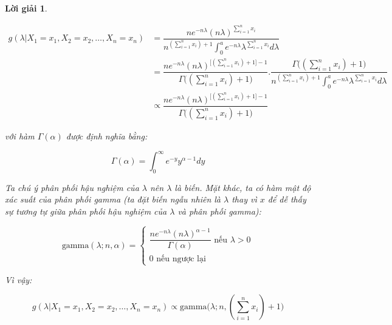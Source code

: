 \documentclass[14pt, a4paper]{article}
\theoremstyle{sltheorem}
\theoremstyle{soltheorem}
\newtheorem*{loigiai}{Lời giải}
\begin{document}
\begin{loigiai}
\begin{enumerate}
\begin{enumerate}[label=(\alph*)]
            \begin{equation*}
                \begin{aligned}
                    g(\lambda \vert X_1 =x_1, X_2=x_2, \dots, X_n=x_n) &= \dfrac{n e^{-n\lambda}(n\lambda)^{\sum_{i=1}^n x_i}}{n^{(\sum_{i=1}^n x_i) + 1}\displaystyle\int_{0}^a e^{-n\lambda} \lambda^{\sum_{i=1}^n x_i}d\lambda} \\
                    &= \dfrac{n e^{-n\lambda}(n\lambda)^{\big\lbrack(\sum_{i=1}^n x_i) + 1\big\rbrack - 1}}{\Gamma\big((\sum_{i=1}^n x_i) + 1\big)}.\dfrac{\Gamma\big((\sum_{i=1}^n x_i) + 1\big)}{n^{(\sum_{i=1}^n x_i) + 1}\displaystyle\int_{0}^a e^{-n\lambda} \lambda^{\sum_{i=1}^n x_i}d\lambda} \\
                    &\propto \dfrac{n e^{-n\lambda}(n\lambda)^{\big\lbrack(\sum_{i=1}^n x_i) + 1\big\rbrack - 1}}{\Gamma\big((\sum_{i=1}^n x_i) + 1\big)}
                \end{aligned}
            \end{equation*}

            với hàm $\Gamma(\alpha)$ được định nghĩa bằng:

            \begin{equation*}
                \Gamma(\alpha) = \int_{0}^{\infty} e^{-y} y^{\alpha - 1} dy
            \end{equation*}

            Ta chú ý phân phối hậu nghiệm của $\lambda$ nên $\lambda$ là biến.
            Mặt khác, ta có hàm mật độ xác suất của phân phối gamma (ta đặt biến ngẫu nhiên là $\lambda$ thay vì $x$ để dễ thấy sự tương tự giữa phân phối hậu nghiệm của $\lambda$ và phân phối gamma):

            \begin{equation*}
                \text{gamma}(\lambda; n, \alpha) = \begin{cases}
                    \dfrac{n e^{-n\lambda} (n\lambda)^{\alpha - 1}}{\Gamma(\alpha)} \text{ nếu } \lambda > 0 \\
                    0 \text{ nếu ngược lại}
                \end{cases}
            \end{equation*}

            Vì vậy:

            \begin{equation*}
                g(\lambda \vert X_1 =x_1, X_2=x_2, \dots, X_n=x_n) \propto \text{gamma}\big(\lambda; n, (\sum_{i=1}^n x_i) + 1\big)
            \end{equation*}


\end{enumerate}
\end{enumerate}
\end{loigiai}
\end{document}
